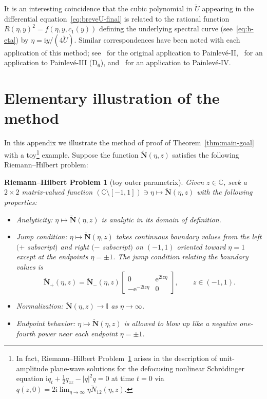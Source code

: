 \documentclass[pdftex]{sigma}
\numberwithin{equation}{section}
\newtheorem{rhp}[Theorem]{Riemann--Hilbert Problem}
 { \theoremstyle{definition}
\newtheorem{Definition}[Theorem]{Definition}
\newtheorem{Note}[Theorem]{Note}
\newtheorem{Example}[Theorem]{Example}
\newtheorem{Remark}[Theorem]{Remark} }
\begin{document}
\begin{Remark}
It is an interesting coincidence that the cubic polynomial in $\breve{U}$ appearing in the differential equation~\eqref{eq:breveU-final} is related to the rational function $R(\eta,y)^2=f(\eta,y,c_1(y))$ defining the underlying spectral curve (see~\eqref{eq:h-eta}) by $\eta=\mathrm{i} y/(4\breve{U})$. Similar correspondences have been noted with each application of this method; see~\cite{BuckinghamM14} for the original application to Painlev\'e-II, \cite{BothnerM20}~for an application to Painlev\'e-III (D$_6$), and~\cite{BuckinghamM-P4} for an application to Painlev\'e-IV.
\end{Remark}

\appendix

\section{Elementary illustration of the method}\label{app:toy-problem}

In this appendix we illustrate the method of proof of Theorem~\ref{thm:main-goal}
with a toy\footnote{In fact, Riemann--Hilbert Problem~\ref{toy-rhp}
arises in the description of unit-amplitude plane-wave solutions for the defocusing nonlinear Schr\"odinger equation $\mathrm{i} q_t +\frac{1}{2}q_{zz} -|q|^2q=0$ at time $t=0$ via $q(z,0)=2\mathrm{i} \lim_{\eta\to\infty}\eta\breve{N}_{12}(\eta,z)$. } example. Suppose the function $\breve{\mathbf{N}}(\eta,z)$ satisfies the
following Riemann--Hilbert problem:
\begin{rhp}[toy outer parametrix]\label{toy-rhp}
Given $z\in\mathbb{C}$, seek a $2\times 2$ matrix-valued function $(\mathbb{C}\setminus[-1,1])\ni\eta\mapsto\breve{\mathbf{N}}(\eta,z)$ with the following properties:
\begin{itemize}\itemsep=0pt
\item[]Analyticity: $\eta\mapsto\breve{\mathbf{N}}(\eta,z)$ is analytic in its domain of definition.
\item[]Jump condition: $\eta\mapsto\breve{\mathbf{N}}(\eta,z)$ takes continuous boundary values from the left $(+$ sub\-script$)$ and right $(-$ subscript$)$ on $(-1,1)$ oriented toward $\eta=1$ except at the endpoints $\eta=\pm 1$. The jump condition relating the boundary values is
\[
\breve{\mathbf{N}}_+(\eta,z)=\breve{\mathbf{N}}_-(\eta,z)\begin{bmatrix}0 & \mathrm{e}^{2\mathrm{i} z\eta}\\
-\mathrm{e}^{-2\mathrm{i} z\eta} & 0\end{bmatrix},\qquad z\in (-1,1).
\]
\item[]Normalization: $\breve{\mathbf{N}}(\eta,z)\to\mathbb{I}$ as $\eta\to\infty$.
\item[]Endpoint behavior: $\eta\mapsto\breve{\mathbf{N}}(\eta,z)$ is allowed to blow up like a negative one-fourth power near each endpoint $\eta=\pm 1$.
\end{itemize}
\end{rhp}
\end{document}
